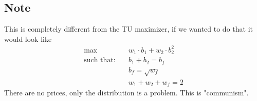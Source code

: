 \documentclass{article}
\begin{document}
\subsection*{Note}
This is completely different from the TU maximizer, if we wanted to do that it would look like
\begin{equation*}
    \begin{aligned}
        \max\quad&w_1\cdot b_1+w_2\cdot b_2^2\\
        \text{such that:}\quad&b_1+b_2=b_f\\
        &b_f=\sqrt{w_f}\\
        &w_1+w_2+w_f=2
    \end{aligned}
\end{equation*}
There are no prices, only the distribution is a problem. This is "communism".
\end{document}
